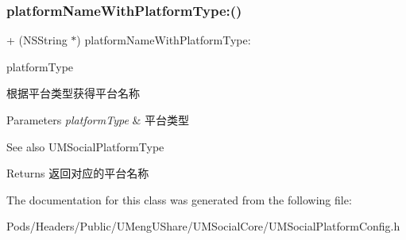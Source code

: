 \subsubsection{\texorpdfstring{platform\+Name\+With\+Platform\+Type\+:()}{platformNameWithPlatformType:()}\hspace{0.1cm}{\footnotesize\ttfamily [2/2]}}
{\footnotesize\ttfamily + (N\+S\+String $\ast$) platform\+Name\+With\+Platform\+Type\+: \begin{DoxyParamCaption}\item[{(U\+M\+Social\+Platform\+Type)}]{platform\+Type }\end{DoxyParamCaption}}

根据平台类型获得平台名称


\begin{DoxyParams}{Parameters}
{\em platform\+Type} & 平台类型 \\
\hline
\end{DoxyParams}
\begin{DoxySeeAlso}{See also}
U\+M\+Social\+Platform\+Type
\end{DoxySeeAlso}
\begin{DoxyReturn}{Returns}
返回对应的平台名称 
\end{DoxyReturn}


The documentation for this class was generated from the following file\+:\begin{DoxyCompactItemize}
\item 
Pods/\+Headers/\+Public/\+U\+Meng\+U\+Share/\+U\+M\+Social\+Core/U\+M\+Social\+Platform\+Config.\+h\end{DoxyCompactItemize}
